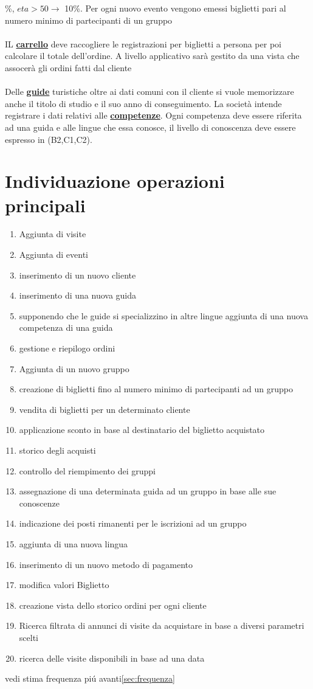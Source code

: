 \documentclass[a4paper,12pt]{report}
\begin{document}
\rightarrow{}\%, \(eta >50 \rightarrow\)  10\%. Per ogni nuovo evento
vengono emessi biglietti pari al numero minimo di partecipanti di un gruppo\\\\
IL \textbf{\underline{carrello}} deve raccogliere le registrazioni per biglietti
a persona per poi calcolare il totale dell'ordine. A livello applicativo sarà
gestito da una vista che assocerà gli ordini fatti dal cliente \\\\
Delle \textbf{\underline{guide}} turistiche oltre ai dati comuni con il cliente
si vuole memorizzare anche il titolo di studio e il suo anno di conseguimento.
La società intende registrare i dati relativi alle
\textbf{\underline{competenze}}. Ogni competenza deve essere riferita ad una
guida e alle lingue che essa conosce, il livello di conoscenza deve essere
espresso in (B2,C1,C2).

\section*{Individuazione operazioni principali}\label{sec:operazioni}
\begin{enumerate}
	\item Aggiunta di visite
	\item Aggiunta di eventi
	\item inserimento di un nuovo cliente
	\item inserimento di una nuova guida
	\item supponendo che le guide si specializzino in altre lingue aggiunta di una nuova competenza di una guida
	\item gestione e riepilogo ordini
	\item Aggiunta di un nuovo gruppo
	\item creazione di biglietti fino al numero minimo di partecipanti ad un gruppo
	\item vendita di biglietti per un determinato cliente
	\item applicazione sconto in base al destinatario del biglietto acquistato
	\item storico degli acquisti
	\item controllo del riempimento dei gruppi
	\item assegnazione di una determinata guida ad un gruppo in base alle sue conoscenze
	\item indicazione dei posti rimanenti per le iscrizioni ad un gruppo
	\item aggiunta di una nuova lingua
	\item inserimento di un nuovo metodo di pagamento
	\item modifica valori Biglietto
	\item creazione vista dello storico ordini per ogni cliente
	\item Ricerca filtrata di annunci di visite da
	      acquistare in base a diversi parametri scelti
	\item ricerca delle visite disponibili in base ad una data
\end{enumerate}
vedi stima frequenza piú avanti\ref{sec:frequenza}
\newpage
\end{document}
